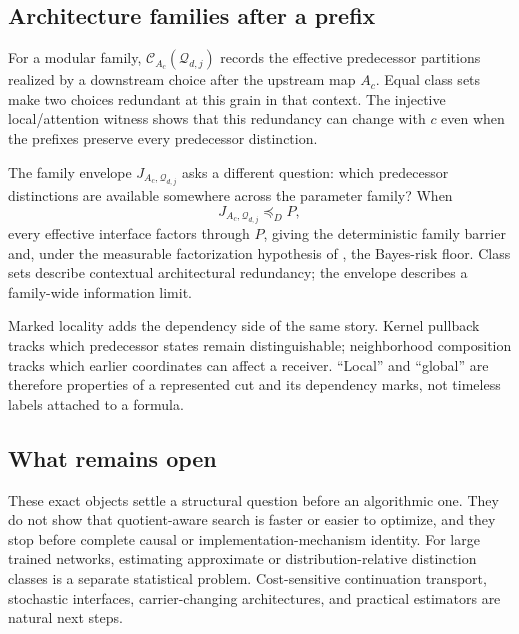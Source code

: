 \subsection{Architecture families after a prefix}

For a modular family, $\mathcal C_{A_c}(\mathcal Q_{d,j})$ records the effective predecessor partitions realized by a downstream choice after the upstream map $A_c$. Equal class sets make two choices redundant at this grain in that context. The injective local/attention witness shows that this redundancy can change with $c$ even when the prefixes preserve every predecessor distinction.

The family envelope $J_{A_c,\mathcal Q_{d,j}}$ asks a different question: which predecessor distinctions are available somewhere across the parameter family? When
\[
J_{A_c,\mathcal Q_{d,j}}\preceq_D P,
\]
every effective interface factors through $P$, giving the deterministic family barrier and, under the measurable factorization hypothesis of , the Bayes-risk floor. Class sets describe contextual architectural redundancy; the envelope describes a family-wide information limit.

Marked locality adds the dependency side of the same story. Kernel pullback tracks which predecessor states remain distinguishable; neighborhood composition tracks which earlier coordinates can affect a receiver. ``Local'' and ``global'' are therefore properties of a represented cut and its dependency marks, not timeless labels attached to a formula.

\subsection{What remains open}

These exact objects settle a structural question before an algorithmic one. They do not show that quotient-aware search is faster or easier to optimize, and they stop before complete causal or implementation-mechanism identity. For large trained networks, estimating approximate or distribution-relative distinction classes is a separate statistical problem. Cost-sensitive continuation transport, stochastic interfaces, carrier-changing architectures, and practical estimators are natural next steps.
